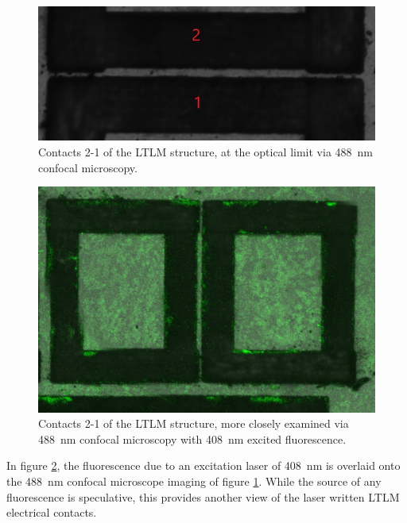 \begin{refsection}
\begin{figure}[H]
    \centering
    \includegraphics[width=\linewidth]{Chapter7/Figs/Raster/21 channel limit esid.jpg}
    \caption{Contacts 2-1 of the LTLM structure, at the optical limit via 488~\si{\nano\metre} confocal microscopy.}
    \label{fig:21_esid_closer}
\end{figure}

\begin{figure}[H]
    \centering
    \includegraphics[width=\linewidth]{Chapter7/Figs/Raster/21_fl_esid.jpg}
    \caption{Contacts 2-1 of the LTLM structure, more closely examined via 488~\si{\nano\metre} confocal microscopy with 408~\si{\nano\metre} excited fluorescence.}
    \label{fig:21_fl_esid}
\end{figure}

In figure \ref{fig:21_fl_esid}, the fluorescence due to an excitation laser of 408~\si{\nano\metre} is overlaid onto the 488~\si{\nano\metre} confocal microscope imaging of figure \ref{fig:21_esid_closer}. While the source of any fluorescence is speculative, this provides another view of the laser written LTLM electrical contacts. 


\end{refsection}
